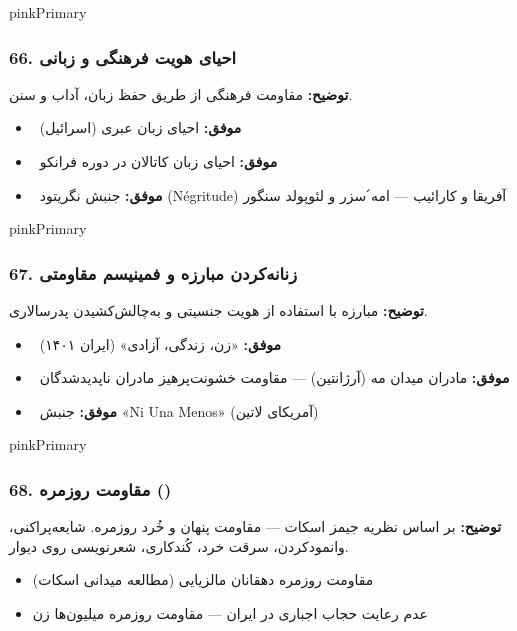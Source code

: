\documentclass[a4paper,12pt]{article}
\newcommand{\success}[1]{\textcolor{greenPrimary}{\faCheckCircle\ \textbf{موفق:}} #1}
\newcommand{\methodnum}[1]{\textcolor{purpleLight}{\textbf{#1.}}}
\begin{document}
\begin{methodcard}{pinkPrimary}
\subsubsection{\methodnum{66} احیای هویت فرهنگی و زبانی}
\textbf{توضیح:} مقاومت فرهنگی از طریق حفظ زبان، آداب و سنن.

\begin{itemize}[label=\textcolor{greenPrimary}{\faCheckCircle}]
  \item \success{احیای زبان عبری (اسرائیل)}
  \item \success{احیای زبان کاتالان در دوره فرانکو}
  \item \success{جنبش نگریتود (N\'{e}gritude) آفریقا و کارائیب — ام\'{ه} سزر و لئوپولد سنگور}
\end{itemize}
\end{methodcard}

\begin{methodcard}{pinkPrimary}
\subsubsection{\methodnum{67} زنانه‌کردن مبارزه و فمینیسم مقاومتی}
\textbf{توضیح:} مبارزه با استفاده از هویت جنسیتی و به‌چالش‌کشیدن پدرسالاری.

\begin{itemize}[label=\textcolor{greenPrimary}{\faCheckCircle}]
  \item \success{«زن، زندگی، آزادی» (ایران ۱۴۰۱)}
  \item \success{مادران میدان مه (آرژانتین) — مقاومت خشونت‌پرهیز مادران ناپدیدشدگان}
  \item \success{جنبش «Ni Una Menos» (آمریکای لاتین)}
\end{itemize}
\end{methodcard}

\begin{methodcard}{pinkPrimary}
\subsubsection{\methodnum{68} مقاومت روزمره ()}
\textbf{توضیح:} بر اساس نظریه جیمز اسکات — مقاومت پنهان و خُرد روزمره. شایعه‌پراکنی، وانمودکردن، سرقت خرد، کُندکاری، شعرنویسی روی دیوار.

\begin{itemize}
  \item مقاومت روزمره دهقانان مالزیایی (مطالعه میدانی اسکات)
  \item عدم رعایت حجاب اجباری در ایران — مقاومت روزمره میلیون‌ها زن
\end{itemize}
\end{methodcard}
\end{document}
